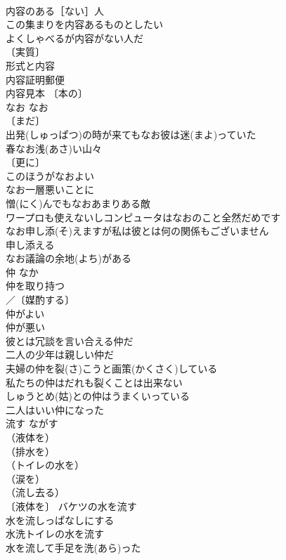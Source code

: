 \documentclass[8pt]{extreport}
\begin{document}
\begin{CJK}{UTF8}{min}
\\	内容のある［ない］人 
\\	この集まりを内容あるものとしたい 
\\	よくしゃべるが内容がない人だ 
\\	〔実質〕
\\	形式と内容 
\\	内容証明郵便 
\\	内容見本 〔本の〕
\\	なお	なお	
\\	〔まだ〕
\\	出発(しゅっぱつ)の時が来てもなお彼は迷(まよ)っていた 
\\	春なお浅(あさ)い山々 
\\	〔更に〕
\\	このほうがなおよい 
\\	なお一層悪いことに 
\\	憎(にく)んでもなおあまりある敵 
\\	ワープロも使えないしコンピュータはなおのこと全然だめです 
\\	なお申し添(そ)えますが私は彼とは何の関係もございません 
\\	申し添える　
\\	なお議論の余地(よち)がある 
\\	仲	なか	
\\	仲を取り持つ 
\\	／〔媒酌する〕
\\	仲がよい 
\\	仲が悪い 
\\	彼とは冗談を言い合える仲だ 
\\	二人の少年は親しい仲だ 
\\	夫婦の仲を裂(さ)こうと画策(かくさく)している 
\\	私たちの仲はだれも裂くことは出来ない 
\\	しゅうとめ(姑)との仲はうまくいっている 
\\	二人はいい仲になった 
\\	流す	ながす	
\\	（液体を）
\\	（排水を）
\\	（トイレの水を）
\\	（涙を）
\\	（流し去る）
\\	〔液体を〕 バケツの水を流す 
\\	水を流しっぱなしにする 
\\	水洗トイレの水を流す 
\\	水を流して手足を洗(あら)った 

\end{CJK}
\end{document}
